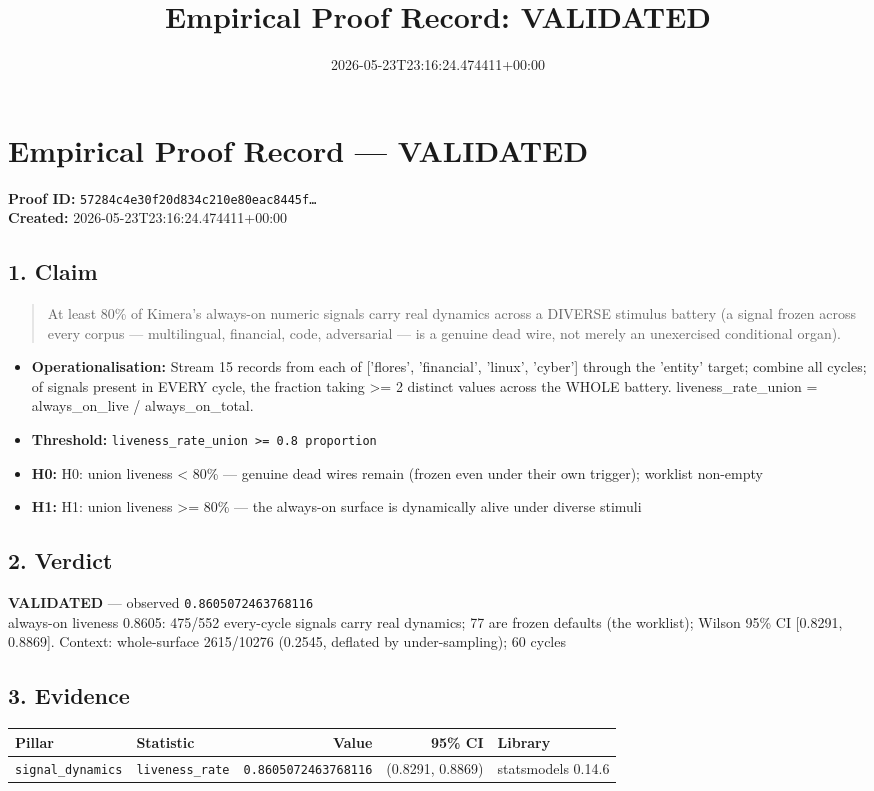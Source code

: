 \documentclass{article}
\title{Empirical Proof Record: VALIDATED}
\date{2026-05-23T23:16:24.474411+00:00}
\begin{document}
\maketitle
\section*{Empirical Proof Record --- \textcolor{validated}{\textbf{VALIDATED}}}
\textbf{Proof ID:} \texttt{57284c4e30f20d834c210e80eac8445f\dots}\\
\textbf{Created:} 2026-05-23T23:16:24.474411+00:00
\subsection*{1. Claim}
\begin{quote}At least 80\% of Kimera's always-on numeric signals carry real dynamics across a DIVERSE stimulus battery (a signal frozen across every corpus — multilingual, financial, code, adversarial — is a genuine dead wire, not merely an unexercised conditional organ).\end{quote}
\begin{itemize}
\item \textbf{Operationalisation:} Stream 15 records from each of ['flores', 'financial', 'linux', 'cyber'] through the 'entity' target; combine all cycles; of signals present in EVERY cycle, the fraction taking >= 2 distinct values across the WHOLE battery. liveness\_rate\_union = always\_on\_live / always\_on\_total.
\item \textbf{Threshold:} \texttt{liveness\_rate\_union >= 0.8 proportion}
\item \textbf{H0:} H0: union liveness < 80\% — genuine dead wires remain (frozen even under their own trigger); worklist non-empty
\item \textbf{H1:} H1: union liveness >= 80\% — the always-on surface is dynamically alive under diverse stimuli
\end{itemize}
\subsection*{2. Verdict}
\textcolor{validated}{\textbf{VALIDATED}} --- observed \texttt{0.8605072463768116}\\
always-on liveness 0.8605: 475/552 every-cycle signals carry real dynamics; 77 are frozen defaults (the worklist); Wilson 95\% CI [0.8291, 0.8869]. Context: whole-surface 2615/10276 (0.2545, deflated by under-sampling); 60 cycles
\subsection*{3. Evidence}
\begin{tabular}{llrrl}\toprule
\textbf{Pillar} & \textbf{Statistic} & \textbf{Value} & \textbf{95\% CI} & \textbf{Library} \\\midrule
\texttt{signal\_dynamics} & \texttt{liveness\_rate} & \texttt{0.8605072463768116} & (0.8291, 0.8869) & statsmodels 0.14.6 \\
\bottomrule\end{tabular}
\end{document}
